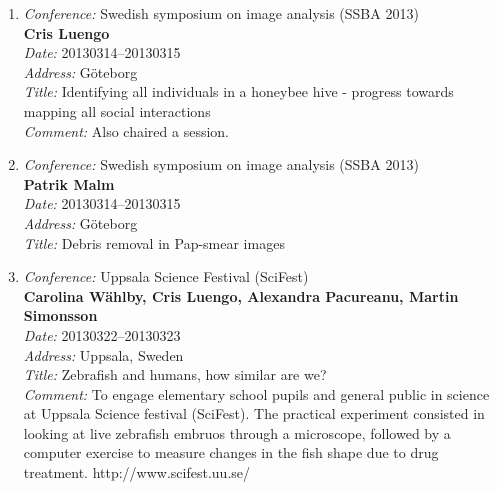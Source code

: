 \begin{enumerate}
\item 
{\em Conference:} Swedish symposium on image analysis (SSBA 2013)~\\
{\bf Cris Luengo}~\\
{\em Date:} 20130314--20130315~\\
{\em Address:} G\"{o}teborg~\\
{\em Title:} Identifying all individuals in a honeybee hive - progress towards mapping all social interactions~\\
{\em Comment:} Also chaired a session.

\item 
{\em Conference:} Swedish symposium on image analysis (SSBA 2013)~\\
{\bf Patrik Malm}~\\
{\em Date:} 20130314--20130315~\\
{\em Address:} G\"{o}teborg~\\
{\em Title:} Debris removal in Pap-smear images

\item
{\em Conference:} Uppsala Science Festival (SciFest)~\\
{\bf Carolina W\"{a}hlby, Cris Luengo, Alexandra Pacureanu, Martin Simonsson}~\\
{\em Date:} 20130322--20130323~\\
{\em Address:} Uppsala, Sweden~\\
{\em Title:} Zebrafish and humans, how similar are we?~\\
{\em Comment:} To engage elementary school pupils and general public in science at Uppsala Science festival (SciFest). The practical experiment consisted in looking at live zebrafish embruos through a microscope, followed by a computer exercise to measure changes in the fish shape due to drug treatment. http://www.scifest.uu.se/ 



\end{enumerate}
